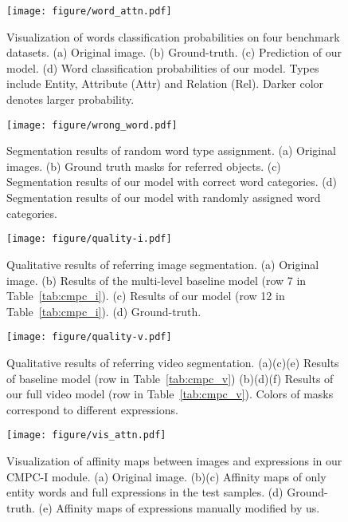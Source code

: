 \documentclass[10pt,journal,cspaper,compsoc]{IEEEtran}
\begin{document}
  \begin{figure}[htbp]
   \centering 
   \texttt{[image: figure/word\_attn.pdf]}
   \caption{Visualization of words classification probabilities on four benchmark datasets. (a) Original image. (b) Ground-truth. (c) Prediction of our model. (d) Word classification probabilities of our model. Types include Entity, Attribute (Attr) and Relation (Rel). Darker color denotes larger probability.}
   \label{fig:word_attn}
 \end{figure}
 
 \begin{figure}[!htbp]
    \begin{center}
       \texttt{[image: figure/wrong\_word.pdf]}
    \end{center}
       \caption{Segmentation results of random word type assignment. (a) Original images. (b) Ground truth masks for referred objects. (c) Segmentation results of our model with correct word categories. (d) Segmentation results of our model with randomly assigned word categories.}
    \label{fig:wrong}
 \end{figure}
 
 \begin{figure}[!htbp]
    \begin{center}
       \texttt{[image: figure/quality-i.pdf]}
    \end{center}
       \caption{Qualitative results of referring image segmentation. (a) Original image. (b) Results of the multi-level baseline model (row 7 in Table~\ref{tab:cmpc_i}). (c) Results of our model (row 12 in Table~\ref{tab:cmpc_i}). (d) Ground-truth.}
    \label{fig:quality-i}
 \end{figure}
 
 \begin{figure}[!htbp]
    \begin{center}
       \texttt{[image: figure/quality-v.pdf]}
    \end{center}
       \caption{Qualitative results of referring video segmentation. (a)(c)(e) Results of baseline model (row  in Table~\ref{tab:cmpc_v}) (b)(d)(f) Results of our full video model (row  in Table~\ref{tab:cmpc_v}). Colors of masks correspond to different expressions.}
    \label{fig:quality-v}
 \end{figure}
 
 \begin{figure*}[!htbp]
    \begin{center}
       \texttt{[image: figure/vis\_attn.pdf]}
    \end{center}
       \caption{Visualization of affinity maps between images and expressions in our CMPC-I module. (a) Original image. (b)(c) Affinity maps of only entity words and full expressions in the test samples. (d) Ground-truth. (e) Affinity maps of expressions manually modified by us.}
    \label{fig:attn_map}
 \end{figure*}
\end{document}
